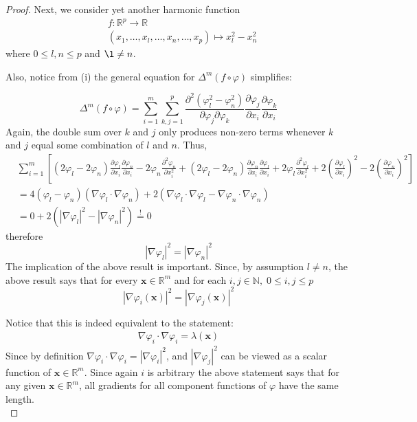 \documentclass[12pt]{article}
\theoremstyle{definition}
\numberwithin{equation}{subsection}
\begin{document}
\begin{proof}
Next, we consider yet another harmonic function 
\begin{align*}
&f: \mathbb{R}^p \rightarrow \mathbb{R} \\
&(x_1 , \ldots,x_l, \ldots, x_n, \ldots , x_p) \mapsto x_l^2 - x_n^2
\end{align*}
where $0 \leq l, n \leq p$ and $\l \neq n$.

Also, notice from (i) the general equation for $\Delta^m(f\circ\varphi)$ simplifies:

$$
\Delta^m(f\circ\varphi) = \sum_{i =1}^{m} \sum_{k,j=1}^p  \frac{\partial^2  \left(\varphi_l^2 - \varphi_n^2\right)}{\partial \varphi_j \partial \varphi_k} \frac{\partial \varphi_j}{\partial x_i} \frac{\partial \varphi_k}{\partial x_i}
$$
Again, the double sum over $k$ and $j$ only produces non-zero terms whenever $k$ and $j$ equal some combination of $l$ and $n$. Thus,
\begin{align*}
&\sum_{i =1}^{m} \left[ (2\varphi_l - 2\varphi_n)\frac{\partial \varphi_l}{\partial x_i} \frac{\partial \varphi_n}{\partial x_i} - 2 \varphi_n \frac{\partial^2\varphi_n}{\partial x_i^2} + (2\varphi_l - 2\varphi_n)\frac{\partial \varphi_n}{\partial x_i} \frac{\partial \varphi_l}{\partial x_i} + 2\varphi_l \frac{\partial^2\varphi_l}{\partial x_i^2} + 2 \left(\frac{\partial \varphi_l}{\partial x_i} \right)^2 - 2 \left(\frac{\partial \varphi_n}{\partial x_i} \right)^2  \right] \\
&=4(\varphi_l - \varphi_n) \left( \nabla\varphi_l \cdot \nabla\varphi_n  \right) + 2 \left( \nabla\varphi_l \cdot \nabla\varphi_l  - \nabla\varphi_n \cdot \nabla\varphi_n \right)\\
&= 0 + 2 \left( |\nabla\varphi_l|^2  - |\nabla\varphi_n|^2 \right) \overset{!}{=} 0 
\end{align*}
therefore
$$
|\nabla\varphi_l |^2 = |\nabla\varphi_n|^2
$$
The implication of the above result is important. Since, by assumption $l \neq n$, the above result says that for every $\mathbf{x} \in \mathbb{R}^m$ and for each $ i, j \in \mathbb{N},\; 0\leq i,j\leq p$
$$
|\nabla\varphi_i ( \mathbf{x} )|^2 = |\nabla\varphi_
j ( \mathbf{x} )|^2
$$

Notice that this is indeed equivalent to the statement:
\begin{align*}
    \nabla\varphi_i \cdot \nabla\varphi_i = \lambda(\mathbf{x}) 
\end{align*}
Since by definition $\nabla\varphi_i \cdot \nabla\varphi_i = | \nabla \varphi_i|^2$, and $| \nabla \varphi_j|^2$ can be viewed as a scalar function of $\mathbf{x} \in \mathbb{R}^m$. Since again $i$ is arbitrary the above statement says that for any given $\mathbf{x} \in \mathbb{R}^m$, all gradients for all component functions of $\varphi$ have the same length.\\


\end{proof}
\end{document}
